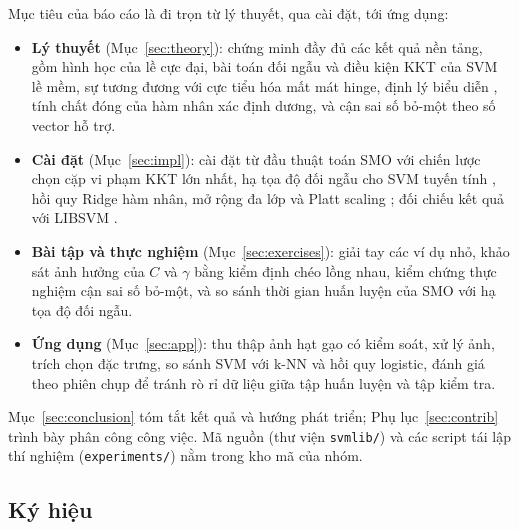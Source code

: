 Mục tiêu của báo cáo là đi trọn từ lý thuyết, qua cài đặt, tới ứng dụng:
\begin{itemize}
  \item \textbf{Lý thuyết} (Mục~\ref{sec:theory}): chứng minh đầy đủ các kết quả nền tảng, gồm hình
        học của lề cực đại, bài toán đối ngẫu và điều kiện KKT của SVM lề mềm, sự tương đương với
        cực tiểu hóa mất mát hinge, định lý biểu diễn \citep{scholkopf2001generalized}, tính chất đóng
        của hàm nhân xác định dương, và cận sai số bỏ-một theo số vector hỗ trợ.
  \item \textbf{Cài đặt} (Mục~\ref{sec:impl}): cài đặt từ đầu thuật toán SMO \citep{platt1998smo}
        với chiến lược chọn cặp vi phạm KKT lớn nhất, hạ tọa độ đối ngẫu cho SVM tuyến tính
        \citep{hsieh2008dual}, hồi quy Ridge hàm nhân, mở rộng đa lớp và Platt scaling
        \citep{platt1999probabilistic}; đối chiếu kết quả với LIBSVM \citep{chang2011libsvm}.
  \item \textbf{Bài tập và thực nghiệm} (Mục~\ref{sec:exercises}): giải tay các ví dụ nhỏ, khảo sát
        ảnh hưởng của $C$ và $\gamma$ bằng kiểm định chéo lồng nhau, kiểm chứng thực nghiệm cận sai số
        bỏ-một, và so sánh thời gian huấn luyện của SMO với hạ tọa độ đối ngẫu.
  \item \textbf{Ứng dụng} (Mục~\ref{sec:app}): thu thập ảnh hạt gạo có kiểm soát, xử lý ảnh, trích
        chọn đặc trưng, so sánh SVM với k-NN và hồi quy logistic, đánh giá theo phiên chụp để tránh
        rò rỉ dữ liệu giữa tập huấn luyện và tập kiểm tra.
\end{itemize}
Mục~\ref{sec:conclusion} tóm tắt kết quả và hướng phát triển; Phụ lục~\ref{sec:contrib} trình bày
phân công công việc. Mã nguồn (thư viện \texttt{svmlib/}) và các script tái lập thí nghiệm
(\texttt{experiments/}) nằm trong kho mã của nhóm.

\subsection{Ký hiệu}\label{sec:notation}

